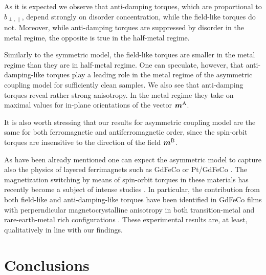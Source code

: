 As it is expected we observe that anti-damping torques, which are proportional to $b_{\perp,\parallel}$, depend strongly on disorder concentration, while the field-like torques do not. Moreover, while anti-damping torques are suppressed by disorder in the metal regime, the opposite is true in the half-metal regime. 

Similarly to the symmetric model, the field-like torques are smaller in the metal regime than they are in half-metal regime. One can speculate, however, that anti-damping-like torques play a leading role in the metal regime of the asymmetric coupling model for sufficiently clean samples. We also see that anti-damping torques reveal rather strong anisotropy. In the metal regime they take on maximal values for in-plane orientations of the vector $\boldsymbol{m}^\textrm{A}$. 
 
It is also worth stressing that our results for asymmetric coupling model are the same for both ferromagnetic and antiferromagnetic order, since the spin-orbit torques are insensitive to the direction of the field $\boldsymbol{m}^\textrm{B}$.  

As have been already mentioned one can expect the asymmetric model to capture also the physics of layered ferrimagnets such as GdFeCo or Pt/GdFeCo \cite{jungfleisch_perspectives_2018, kim_spin-orbit_2018}. The magnetization switching by means of spin-orbit torques in these materials has recently become a subject of intense studies 
\cite{roschewsky_spin-orbit_2016, roschewsky_spin-orbit_2017, kim_spin-orbit_2018}.  In particular, the contribution from both field-like and anti-damping-like torques have been identified in GdFeCo films with perperndicular magnetocrystalline anisotropy in both transition-metal and rare-earth-metal rich configurations \cite{roschewsky_spin-orbit_2016, roschewsky_spin-orbit_2017}. 
These experimental results are, at least, qualitatively in line with our findings. 

\section{Conclusions}
 
